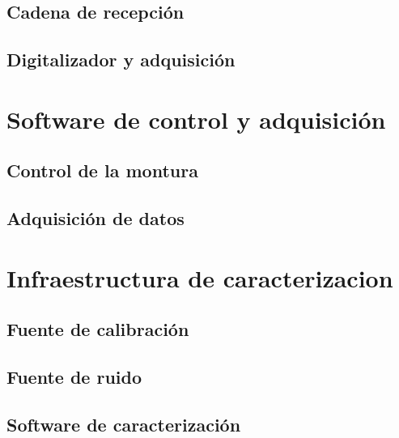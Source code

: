 \subsection{Cadena de recepción}

\subsection{Digitalizador y adquisición}

\section{Software de control y adquisición}

\subsection{Control de la montura}

\subsection{Adquisición de datos}

\section{Infraestructura de caracterizacion}

\subsection{Fuente de calibración}

\subsection{Fuente de ruido}

\subsection{Software de caracterización}
